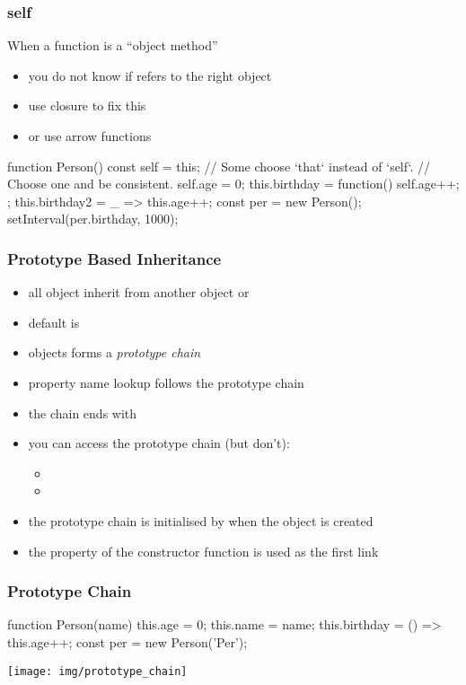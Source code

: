 \begin{frame}[fragile] \frametitle{self}
When a function is a ``object method''
\begin{itemize}
  \item you do not know if  refers to the right object
  \item use closure to fix this
  \item or use arrow functions
\end{itemize}
\begin{CodeBox}{}
function Person() {
  const self = this; // Some choose `that` instead of `self`. 
                           // Choose one and be consistent.
  self.age = 0;
  this.birthday = function() { self.age++; };
  this.birthday2 = _ =>  this.age++;
}
const per = new Person();
setInterval(per.birthday, 1000);
\end{CodeBox}
\end{frame}

\begin{frame}[fragile] \frametitle{Prototype Based Inheritance}

\begin{itemize}
  \item all object inherit from another object or 
  \item default is 
  \item objects forms a \emph{prototype chain}
  \item property name lookup follows the prototype chain
  \item the chain ends with 
  \item you can access the prototype chain (but don't):
  \begin{itemize}
    \item {}
    \item {}
  \end{itemize}
  \item the prototype chain is initialised by  when the object is created
  \item the  property of the constructor function  is used as the first link
\end{itemize}
\end{frame}

\begin{frame}[fragile]
\frametitle{Prototype Chain}
\begin{CodeBox}{}
function Person(name) {
  this.age = 0;
  this.name = name;
  this.birthday = () =>  this.age++;
}
const per = new Person('Per');
\end{CodeBox}
  \centering
  \texttt{[image: img/prototype\_chain]}

\end{frame}

